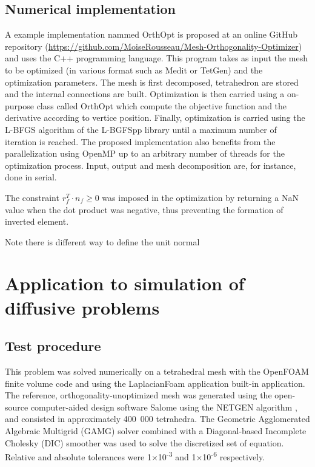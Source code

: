 \documentclass[11pt]{article}
\begin{document}
\subsection{Numerical implementation}

A example implementation nammed OrthOpt is proposed at an online GitHub repository (\href{https://github.com/MoiseRousseau/Mesh-Orthogonality-Optimizer}{https://github.com/MoiseRousseau/Mesh-Orthogonality-Optimizer}) and uses the C++ programming language. 
This program takes as input the mesh to be optimized (in various format such as Medit or TetGen) and the optimization parameters.
The mesh is first decomposed, tetrahedron are stored and the internal connections are built. 
Optimization is then carried using a on-purpose class called OrthOpt which compute the objective function and the derivative according to vertice position. 
Finally, optimization is carried using the L-BFGS algorithm of the L-BGFSpp library \cite{} until a maximum number of iteration is reached.
The proposed implementation also benefits from the parallelization using OpenMP up to an arbitrary number of threads for the optimization process.
Input, output and mesh decomposition are, for instance, done in serial.

The constraint $r_f^T \cdot n_f \geq 0$ was imposed in the optimization by returning a NaN value when the dot product was negative, thus preventing the formation of inverted element.

Note there is different way to define the unit normal



\section{Application to simulation of diffusive problems}

\subsection{Test procedure}

This problem was solved numerically on a tetrahedral mesh with the OpenFOAM finite volume code \cite{} and using the LaplacianFoam application built-in application.
The reference, orthogonality-unoptimized mesh was generated using the open-source computer-aided design software Salome using the NETGEN algorithm \cite{schrobert_netgen}, and consisted in approximately 400~000 tetrahedra.
The Geometric Agglomerated Algebraic Multigrid (GAMG) solver combined with a Diagonal-based Incomplete Cholesky (DIC) smoother was used to solve the discretized set of equation. 
Relative and absolute tolerances were 1$\times$10\textsuperscript{-3} and 1$\times$10\textsuperscript{-6} respectively.
\end{document}
